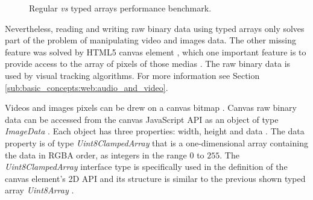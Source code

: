 \begin{figure}[!htb]
  \caption{Regular \textit{vs} typed arrays performance benchmark.}
  \label{figure:typed_arrays_performance}
\end{figure}

Nevertheless, reading and writing raw binary data \cite{Canvas2013,TypedArray2013} using typed arrays only solves part of the problem of manipulating video and images data. The other missing feature was solved by HTML5 \cite{Hickson2013} canvas element \cite{Canvas2013}, which one important feature is to provide access to the array of pixels of those medias \cite{Canvas2013,Hickson2013}. The raw binary data is used by visual tracking algorithms. For more information see Section \ref{sub:basic_concepts:web:audio_and_video}.

 Videos and images pixels can be drew on a canvas bitmap \cite{Canvas2013}. Canvas raw binary data can be accessed from the canvas JavaScript \cite{International2009} API as an object of type \textit{ImageData} \cite{Canvas2013}. Each object has three properties: width, height and data \cite{Canvas2013,MDN2013}. The data property is of type \textit{Uint8ClampedArray} \cite{TypedArray2013} that is a one-dimensional array containing the data in RGBA \cite{Gonzalez2007} order, as integers in the range $0$ to $255$. The \textit{Uint8ClampedArray} \cite{TypedArray2013} interface type is specifically used in the definition of the canvas element's 2D API and its structure is  similar to the previous shown typed array \textit{Uint8Array} \cite{Canvas2013,TypedArray2013}.

